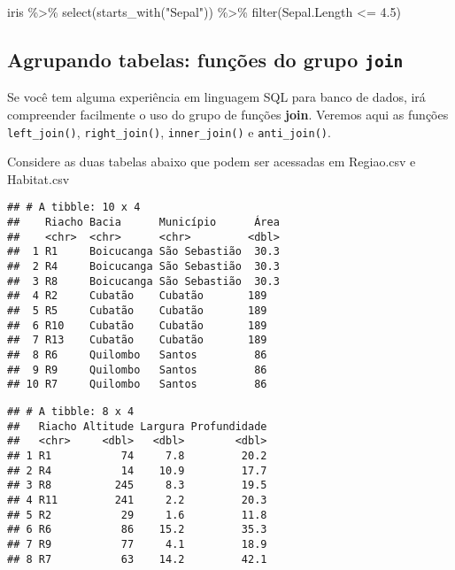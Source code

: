 \documentclass[
]{book}
\newenvironment{Shaded}{\begin{snugshade}}{\end{snugshade}}
\newcommand{\FloatTok}[1]{\textcolor[rgb]{0.00,0.00,0.81}{#1}}
\newcommand{\FunctionTok}[1]{\textcolor[rgb]{0.00,0.00,0.00}{#1}}
\newcommand{\NormalTok}[1]{#1}
\newcommand{\SpecialCharTok}[1]{\textcolor[rgb]{0.00,0.00,0.00}{#1}}
\newcommand{\StringTok}[1]{\textcolor[rgb]{0.31,0.60,0.02}{#1}}
\begin{document}
\begin{Shaded}
\begin{Highlighting}[]
\NormalTok{iris }\SpecialCharTok{\%\textgreater{}\%} 
  \FunctionTok{select}\NormalTok{(}\FunctionTok{starts\_with}\NormalTok{(}\StringTok{"Sepal"}\NormalTok{)) }\SpecialCharTok{\%\textgreater{}\%} 
  \FunctionTok{filter}\NormalTok{(Sepal.Length }\SpecialCharTok{\textless{}=} \FloatTok{4.5}\NormalTok{)}
\end{Highlighting}
\end{Shaded}

\hypertarget{agrupando-tabelas-funuxe7uxf5es-do-grupo-join}{%
\subsection{\texorpdfstring{Agrupando tabelas: funções do grupo \texttt{join}}{Agrupando tabelas: funções do grupo join}}\label{agrupando-tabelas-funuxe7uxf5es-do-grupo-join}}

Se você tem alguma experiência em linguagem SQL para banco de dados, irá compreender facilmente o uso do grupo de funções \textbf{join}. Veremos aqui as funções \texttt{left\_join()}, \texttt{right\_join()}, \texttt{inner\_join()} e \texttt{anti\_join()}.

Considere as duas tabelas abaixo que podem ser acessadas em Regiao.csv e Habitat.csv

\begin{verbatim}
## # A tibble: 10 x 4
##    Riacho Bacia      Município      Área
##    <chr>  <chr>      <chr>         <dbl>
##  1 R1     Boicucanga São Sebastião  30.3
##  2 R4     Boicucanga São Sebastião  30.3
##  3 R8     Boicucanga São Sebastião  30.3
##  4 R2     Cubatão    Cubatão       189  
##  5 R5     Cubatão    Cubatão       189  
##  6 R10    Cubatão    Cubatão       189  
##  7 R13    Cubatão    Cubatão       189  
##  8 R6     Quilombo   Santos         86  
##  9 R9     Quilombo   Santos         86  
## 10 R7     Quilombo   Santos         86
\end{verbatim}

\begin{verbatim}
## # A tibble: 8 x 4
##   Riacho Altitude Largura Profundidade
##   <chr>     <dbl>   <dbl>        <dbl>
## 1 R1           74     7.8         20.2
## 2 R4           14    10.9         17.7
## 3 R8          245     8.3         19.5
## 4 R11         241     2.2         20.3
## 5 R2           29     1.6         11.8
## 6 R6           86    15.2         35.3
## 7 R9           77     4.1         18.9
## 8 R7           63    14.2         42.1
\end{verbatim}
\end{document}
